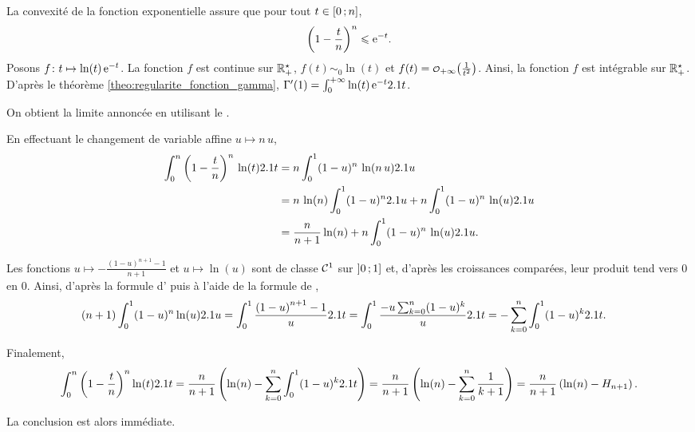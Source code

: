 \begin{solution}
\begin{reponses}
\item La convexité de la fonction exponentielle assure que pour tout $t \in \interff{0}{n}$,
\[
\left(1 - \frac{t}{n}\right)^n \leqslant \e^{-t}.
\]
Posons $\fonctionligne[f]{t}{\ln(t) \, \e^{-t}}$. La fonction $f$ est continue sur $\Rpe$, $f(t) \sim_0 \ln(t)$ et $f(t) = \petito_{+\infty}\mathopen{}\left(\frac{1}{t^2}\right)$. Ainsi, la fonction $f$ est intégrable sur $\Rpe$. \\

D'après le théorème \ref{theo:regularite_fonction_gamma}, $\Gamma'(1) = \int_0^{+\infty} \ln(t) \, \e^{-t} \d t$. 

On obtient la limite annoncée en utilisant le .

\item En effectuant le changement de variable affine $u \mapsto n \, u$,
\begin{align*}
\int_0^n \left(1 - \frac{t}{n}\right)^n \, \ln(t) \d t
&= n \int_0^1 (1 - u)^n \, \ln(n \, u) \d u \\
&= n \, \ln(n) \int_0^1 (1 - u)^n \d u + n \int_0^1 (1 - u)^n \, \ln(u) \d u\\
&= \frac{n}{n+1} \ln(n) + n \int_0^1 (1 - u)^n \, \ln(u) \d u.
\end{align*}

\item Les fonctions $u \mapsto -\frac{(1 - u)^{n+1} - 1}{n+1}$ et $u \mapsto \ln(u)$ sont de classe $\Cont^1$ sur $\interof{0}{1}$ et, d'après les croissances comparées, leur produit tend vers $0$ en $0$. Ainsi, d'après la formule d' puis à l'aide de la formule de ,
\begin{align*}
(n+1) \int_0^1 (1 - u)^n \ln(u) \d u
&= \int_0^1 \frac{\left(1 - u\right)^{n+1} - 1}{u} \d t
= \int_0^1 \frac{- u \sum_{k=0}^n (1 - u)^k}{u} \d t
= -\sum_{k=0}^n \int_0^1 (1 - u)^k \d t.
\end{align*}

\item Finalement,
\begin{align*}
\int_0^n \left(1 - \frac{t}{n}\right)^n \ln(t) \d t
&= \frac{n}{n+1} \left(\ln(n) - \sum_{k=0}^n \int_0^1 (1 - u)^k \d t\right)
= \frac{n}{n+1} \left(\ln(n) - \sum_{k=0}^n \frac{1}{k+1}\right)
= \frac{n}{n+1} \left(\ln(n) - H_{n+1}\right).\\
\end{align*}

\item La conclusion est alors immédiate.
\end{reponses}
\end{solution}


